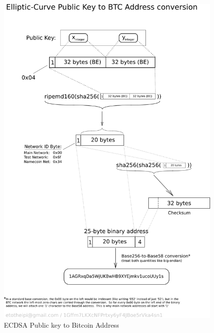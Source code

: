 \begin{figure}
\centering
\includegraphics[width=\linewidth]{fig/PubKeyToAddr.png}
  \caption{ECDSA Public key to Bitcoin Address ~\cite{techaddress}}
\label{fig:pubkeytoaddr}
\end{figure}


